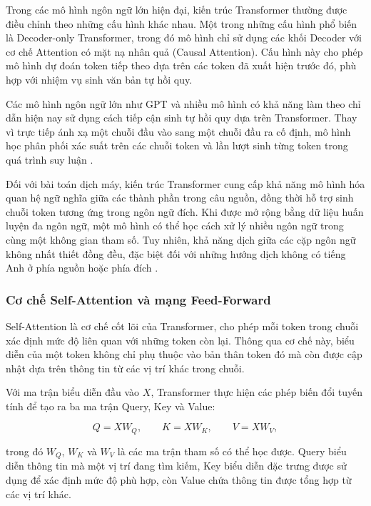Trong các mô hình ngôn ngữ lớn hiện đại, kiến trúc Transformer thường được điều chỉnh theo những cấu hình khác nhau. Một trong những cấu hình phổ biến là Decoder-only Transformer, trong đó mô hình chỉ sử dụng các khối Decoder với cơ chế Attention có mặt nạ nhân quả (Causal Attention). Cấu hình này cho phép mô hình dự đoán token tiếp theo dựa trên các token đã xuất hiện trước đó, phù hợp với nhiệm vụ sinh văn bản tự hồi quy.

Các mô hình ngôn ngữ lớn như GPT và nhiều mô hình có khả năng làm theo chỉ dẫn hiện nay sử dụng cách tiếp cận sinh tự hồi quy dựa trên Transformer. Thay vì trực tiếp ánh xạ một chuỗi đầu vào sang một chuỗi đầu ra cố định, mô hình học phân phối xác suất trên các chuỗi token và lần lượt sinh từng token trong quá trình suy luận \cite{brown2020language,radford2019language}.

Đối với bài toán dịch máy, kiến trúc Transformer cung cấp khả năng mô hình hóa quan hệ ngữ nghĩa giữa các thành phần trong câu nguồn, đồng thời hỗ trợ sinh chuỗi token tương ứng trong ngôn ngữ đích. Khi được mở rộng bằng dữ liệu huấn luyện đa ngôn ngữ, một mô hình có thể học cách xử lý nhiều ngôn ngữ trong cùng một không gian tham số. Tuy nhiên, khả năng dịch giữa các cặp ngôn ngữ không nhất thiết đồng đều, đặc biệt đối với những hướng dịch không có tiếng Anh ở phía nguồn hoặc phía đích \cite{zhu-etal-2024-multilingual}.

\subsubsection{Cơ chế Self-Attention và mạng Feed-Forward}

Self-Attention là cơ chế cốt lõi của Transformer, cho phép mỗi token trong chuỗi xác định mức độ liên quan với những token còn lại. Thông qua cơ chế này, biểu diễn của một token không chỉ phụ thuộc vào bản thân token đó mà còn được cập nhật dựa trên thông tin từ các vị trí khác trong chuỗi.

Với ma trận biểu diễn đầu vào $X$, Transformer thực hiện các phép biến đổi tuyến tính để tạo ra ba ma trận Query, Key và Value:

\begin{equation}
    Q = XW_Q,\qquad
    K = XW_K,\qquad
    V = XW_V,
\end{equation}

trong đó $W_Q$, $W_K$ và $W_V$ là các ma trận tham số có thể học được. Query biểu diễn thông tin mà một vị trí đang tìm kiếm, Key biểu diễn đặc trưng được sử dụng để xác định mức độ phù hợp, còn Value chứa thông tin được tổng hợp từ các vị trí khác.

